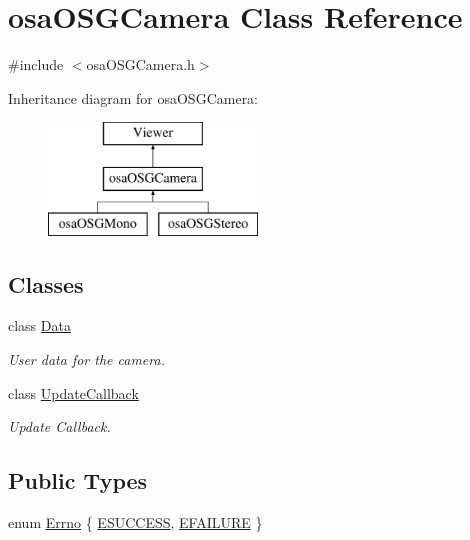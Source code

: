 \hypertarget{classosa_o_s_g_camera}{\section{osa\-O\-S\-G\-Camera Class Reference}
\label{classosa_o_s_g_camera}
}


{\ttfamily \#include $<$osa\-O\-S\-G\-Camera.\-h$>$}

Inheritance diagram for osa\-O\-S\-G\-Camera\-:\begin{figure}[H]
\begin{center}
\leavevmode
\includegraphics[height=3.000000cm]{d4/d82/classosa_o_s_g_camera}
\end{center}
\end{figure}
\subsection*{Classes}
\begin{DoxyCompactItemize}
\item 
class \hyperlink{classosa_o_s_g_camera_1_1_data}{Data}
\begin{DoxyCompactList}\small\item\em User data for the camera. \end{DoxyCompactList}\item 
class \hyperlink{classosa_o_s_g_camera_1_1_update_callback}{Update\-Callback}
\begin{DoxyCompactList}\small\item\em Update Callback. \end{DoxyCompactList}\end{DoxyCompactItemize}
\subsection*{Public Types}
\begin{DoxyCompactItemize}
\item 
enum \hyperlink{classosa_o_s_g_camera_ad52eea10482129213b72fc2c49cd47de}{Errno} \{ \hyperlink{classosa_o_s_g_camera_ad52eea10482129213b72fc2c49cd47dea071d69d598088d2662c8e61f1f0bbd77}{E\-S\-U\-C\-C\-E\-S\-S}, 
\hyperlink{classosa_o_s_g_camera_ad52eea10482129213b72fc2c49cd47dea7932133d20cd961c6c6831812b1abc64}{E\-F\-A\-I\-L\-U\-R\-E}
 \}
\end{DoxyCompactItemize}
